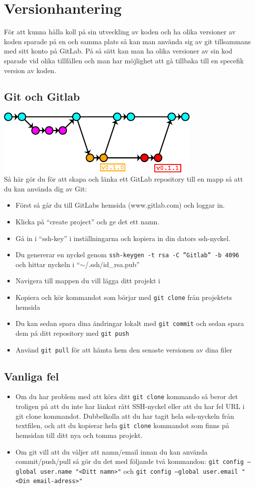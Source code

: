 \documentclass{TDP003mall}
\begin{document}
\section{Versionhantering}
För att kunna hålla koll på sin utveckling av koden och ha olika versioner av koden sparade på en och samma plats så kan man använda sig av git tillsammans med sitt konto på GitLab. På så sätt kan man ha olika versioner av sin kod sparade vid olika tillfällen och man har möjlighet att gå tillbaka till en specefik version av koden.
\subsection*{Git och Gitlab}
\includegraphics[width=100mm]{git}\\
Så här gör du för att skapa och länka ett GitLab repository till en mapp så att du kan använda dig av Git:
\begin{itemize}

\item Först så går du till GitLabs hemsida (www.gitlab.com) och loggar in.
\item Klicka på ``create project'' och ge det ett namn.
\item Gå in i ``ssh-key'' i inställningarna och kopiera in din dators ssh-nyckel.
\item Du genererar en nyckel genom \texttt{ssh-keygen -t rsa -C ”Gitlab” -b 4096} och hittar nyckeln i ``$\sim$/.ssh/id\_rsa.pub''
\item Navigera till mappen du vill lägga ditt projekt i
\item Kopiera och kör kommandot som börjar med \texttt{git clone} från projektets hemsida
\item Du kan sedan spara dina ändringar lokalt med \texttt{git commit} och sedan spara dem på ditt repository med \texttt{git push}
\item Använd \texttt{git pull} för att hämta hem den senaste versionen av dina filer
\end{itemize}
\subsection*{Vanliga fel}
\begin{itemize}
\item Om du har problem med att köra ditt \texttt{git clone} kommando så beror det troligen på att du inte har länkat rått SSH-nyckel eller att du har fel URL i git clone kommandot. Dubbelkolla att du har tagit hela ssh-nyckeln från textfilen, och att du kopierar hela \texttt{git clone} kommandot som finns på hemsidan till ditt nya och tomma projekt.
\item Om git vill att du väljer att namn/email innan du kan använda commit/push/pull så gör du det med följande två kommandon: \texttt{git config --global user.name "<Ditt namn>"} och \texttt{git config --global user.email "<Din email-adress>"}
\end{itemize}
\end{document}

